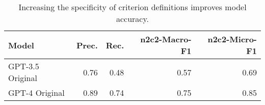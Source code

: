 \begin{table}
\caption{Increasing the specificity of criterion definitions improves model accuracy.}
\label{tab:prompt_eng}
\begin{tabular}{lrrrr}
\toprule
Model & Prec. & Rec. & n2c2-Macro-F1 & n2c2-Micro-F1 \\
\midrule
GPT-3.5 Original & 0.76 & 0.48 & 0.57 & 0.69 \\
GPT-4 Original & 0.89 & 0.74 & 0.75 & 0.85 \\
\bottomrule
\end{tabular}
\end{table}
